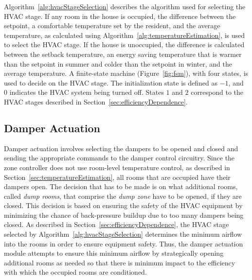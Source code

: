 Algorithm~\ref{alg:hvacStageSelection} describes the algorithm used for
selecting the HVAC stage. If any room in the house is occupied, the difference
between the setpoint, a comfortable temperature set by the resident, and the
average temperature, as calculated using
Algorithm~\ref{alg:temperatureEstimation}, is used to select the HVAC stage. If
the house is unoccupied, the difference is calculated between the setback
temperature, an energy saving temperature that is warmer than the setpoint in
summer and colder than the setpoint in winter, and the average temperature. A
finite-state machine (Figure~\ref{fig:fsm}), with four states, is used to decide
on the HVAC stage. The initialization state is defined as $-1$, and $0$
indicates the HVAC system being turned off. States $1$ and $2$ correspond to the
HVAC stages described in Section~\ref{sec:efficiencyDependence}.

\begin{figure}[t]
\end{figure}

\subsection{Damper Actuation}
\label{sec:damperActuation}


Damper actuation involves selecting the dampers to be opened and closed and
sending the appropriate commands to the damper control circuitry. Since the zone
controller does not use room-level temperature control, as described in
Section~\ref{sec:temperatureEstimation}, all rooms that are occupied have their
dampers open. The decision that has to be made is on what additional rooms,
called {\em dump rooms}, that comprise the {\em dump zone} have to be opened, if
they are closed. This decision is based on ensuring the safety of the HVAC
equipment by minimizing the chance of back-pressure buildup due to too many
dampers being closed. As described in
Section~\ref{sec:efficiencyDependence}, the HVAC stage selected by
Algorithm~\ref{alg:hvacStageSelection} determines the minimum airflow into the
rooms in order to ensure equipment safety. Thus, the damper actuation module
attempts to ensure this minimum airflow by strategically opening additional
rooms as needed so that there is minimum impact to the efficiency with which the
occupied rooms are conditioned. 

